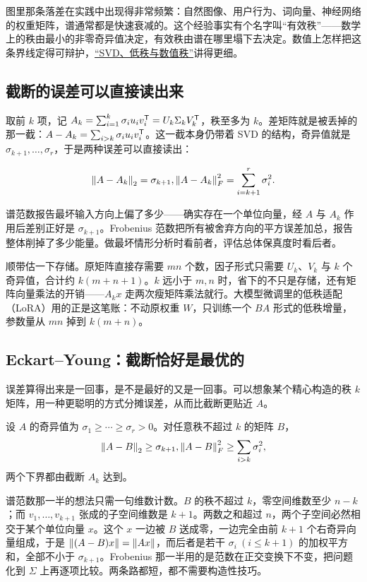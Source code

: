 图里那条落差在实践中出现得非常频繁：自然图像、用户行为、词向量、神经网络的权重矩阵，谱通常都是快速衰减的。这个经验事实有个名字叫``有效秩''——数学上的秩由最小的非零奇异值决定，有效秩由谱在哪里塌下去决定。数值上怎样把这条界线定得可辩护，\hyperref[sec:08-Numerical-Analysis/05-Numerical-Linear-Algebra/06]{``SVD、低秩与数值秩''}讲得更细。

\subsection{截断的误差可以直接读出来}

取前 \(k\) 项，记 \(A_k=\sum_{i=1}^{k}\sigma_iu_iv_i^{\mathsf{T}}=U_k\Sigma_kV_k^{\mathsf{T}}\)，秩至多为 \(k\)。差矩阵就是被丢掉的那一截：\(A-A_k=\sum_{i>k}\sigma_iu_iv_i^{\mathsf{T}}\)。这一截本身仍带着 SVD 的结构，奇异值就是 \(\sigma_{k+1},\ldots,\sigma_r\)，于是两种误差可以直接读出：

\[
\left\lVert A-A_k\right\rVert_2=\sigma_{k+1},
\space
\left\lVert A-A_k\right\rVert_F^2=\sum_{i=k+1}^{r}\sigma_i^2 .
\]

谱范数报告最坏输入方向上偏了多少——确实存在一个单位向量，经 \(A\) 与 \(A_k\) 作用后差别正好是 \(\sigma_{k+1}\)。Frobenius 范数把所有被舍弃方向的平方误差加总，报告整体削掉了多少能量。做最坏情形分析时看前者，评估总体保真度时看后者。

顺带估一下存储。原矩阵直接存需要 \(mn\) 个数，因子形式只需要 \(U_k\)、\(V_k\) 与 \(k\) 个奇异值，合计约 \(k(m+n+1)\)。\(k\) 远小于 \(m,n\) 时，省下的不只是存储，还有矩阵向量乘法的开销——\(A_kx\) 走两次瘦矩阵乘法就行。大模型微调里的低秩适配（LoRA）用的正是这笔账：不动原权重 \(W\)，只训练一个 \(BA\) 形式的低秩增量，参数量从 \(mn\) 掉到 \(k(m+n)\)。

\subsection{Eckart--Young：截断恰好是最优的}

误差算得出来是一回事，是不是最好的又是一回事。可以想象某个精心构造的秩 \(k\) 矩阵，用一种更聪明的方式分摊误差，从而比截断更贴近 \(A\)。

\begin{theorem}
设 \(A\) 的奇异值为 \(\sigma_1\ge\cdots\ge\sigma_r>0\)。对任意秩不超过 \(k\) 的矩阵 \(B\)，
\[
\left\lVert A-B\right\rVert_2\ge\sigma_{k+1},
\space
\left\lVert A-B\right\rVert_F^2\ge\sum_{i>k}\sigma_i^2,
\]
两个下界都由截断 \(A_k\) 达到。
\end{theorem}

谱范数那一半的想法只需一句维数计数。\(B\) 的秩不超过 \(k\)，零空间维数至少 \(n-k\)；而 \(v_1,\ldots,v_{k+1}\) 张成的子空间维数是 \(k+1\)。两数之和超过 \(n\)，两个子空间必然相交于某个单位向量 \(x\)。这个 \(x\) 一边被 \(B\) 送成零，一边完全由前 \(k+1\) 个右奇异向量组成，于是 \(\left\lVert(A-B)x\right\rVert=\left\lVert Ax\right\rVert\)，而后者是若干 \(\sigma_i\ (i\le k+1)\) 的加权平方和，全部不小于 \(\sigma_{k+1}\)。Frobenius 那一半用的是范数在正交变换下不变，把问题化到 \(\Sigma\) 上再逐项比较。两条路都短，都不需要构造性技巧。

